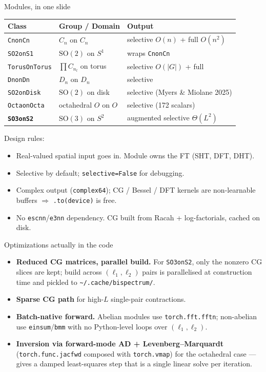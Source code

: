 \documentclass[10pt,aspectratio=169]{beamer}
\newcommand{\SO}{\mathrm{SO}}
\begin{document}
\begin{frame}{Modules, in one slide}
\begin{table}\centering\small
\begin{tabular}{lll}
\toprule
Class & Group / Domain & Output \\
\midrule
\texttt{CnonCn} & $C_n$ on $C_n$ & selective $O(n)$ + full $O(n^2)$ \\
\texttt{SO2onS1} & $\SO(2)$ on $S^1$ & wraps \texttt{CnonCn} \\
\texttt{TorusOnTorus} & $\prod C_{n_l}$ on torus & selective $O(|G|)$ + full \\
\texttt{DnonDn} & $D_n$ on $D_n$ & selective \\
\texttt{SO2onDisk} & $\SO(2)$ on disk & selective (Myers \& Miolane 2025) \\
\texttt{OctaonOcta} & octahedral $O$ on $O$ & selective (172 scalars) \\
\texttt{\textbf{SO3onS2}} & $\SO(3)$ on $S^2$ & \alert{augmented selective $\Theta(L^2)$} \\
\bottomrule
\end{tabular}
\end{table}
\vspace{0.4em}
Design rules:
\begin{itemize}
  \item Real-valued spatial input goes in. Module owns the FT (SHT, DFT, DHT).
  \item Selective by default; \texttt{selective=False} for debugging.
  \item Complex output (\texttt{complex64}); CG / Bessel / DFT kernels are
        non-learnable buffers $\Rightarrow$ \texttt{.to(device)} is free.
  \item No \texttt{escnn}/\texttt{e3nn} dependency. CG built from Racah +
        log-factorials, cached on disk.
\end{itemize}
\end{frame}

\begin{frame}{Optimizations actually in the code}
\begin{itemize}
  \item \textbf{Reduced CG matrices, parallel build.}
        For \texttt{SO3onS2}, only the nonzero CG slices are kept; build
        across $(\ell_1,\ell_2)$ pairs is parallelised at construction time
        and pickled to \texttt{\textasciitilde/.cache/bispectrum/}.
  \item \textbf{Sparse CG path} for high-$L$ single-pair contractions.
  \item \textbf{Batch-native forward.}
        Abelian modules use \texttt{torch.fft.fftn}; non-abelian use
        \texttt{einsum}/\texttt{bmm} with no Python-level loops over $(\ell_1,\ell_2)$.
  \item \textbf{Inversion via forward-mode AD + Levenberg--Marquardt}
        (\texttt{torch.func.jacfwd} composed with \texttt{torch.vmap}) for
        the octahedral case --- gives a damped least-squares step that is
        a single linear solve per iteration.
\end{itemize}
\end{frame}
\end{document}

